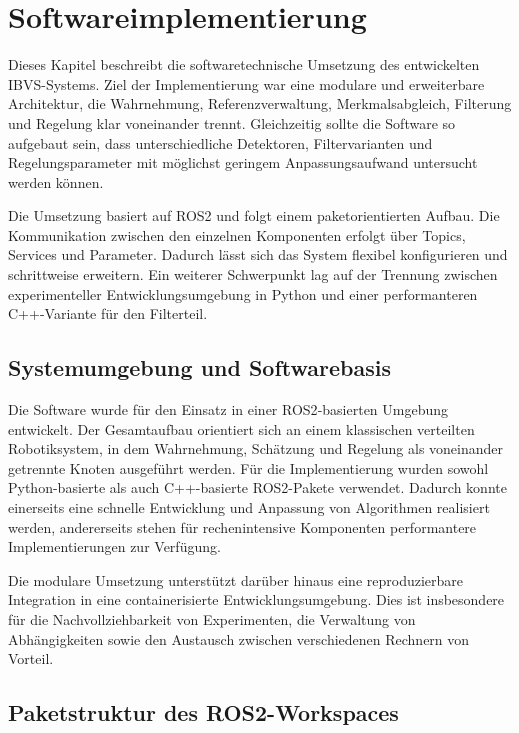\chapter{Softwareimplementierung}
\label{chap:softwareimplementierung}

Dieses Kapitel beschreibt die softwaretechnische Umsetzung des entwickelten \ac{IBVS}-Systems. Ziel der Implementierung war eine modulare und erweiterbare Architektur, die Wahrnehmung, Referenzverwaltung, Merkmalsabgleich, Filterung und Regelung klar voneinander trennt. Gleichzeitig sollte die Software so aufgebaut sein, dass unterschiedliche Detektoren, Filtervarianten und Regelungsparameter mit möglichst geringem Anpassungsaufwand untersucht werden können.

Die Umsetzung basiert auf \ac{ROS2} und folgt einem paketorientierten Aufbau. Die Kommunikation zwischen den einzelnen Komponenten erfolgt über Topics, Services und Parameter. Dadurch lässt sich das System flexibel konfigurieren und schrittweise erweitern. Ein weiterer Schwerpunkt lag auf der Trennung zwischen experimenteller Entwicklungsumgebung in Python und einer performanteren C++-Variante für den Filterteil.

\section{Systemumgebung und Softwarebasis}
\label{sec:systemumgebung_softwarebasis}

Die Software wurde für den Einsatz in einer \ac{ROS2}-basierten Umgebung entwickelt. Der Gesamtaufbau orientiert sich an einem klassischen verteilten Robotiksystem, in dem Wahrnehmung, Schätzung und Regelung als voneinander getrennte Knoten ausgeführt werden. Für die Implementierung wurden sowohl Python-basierte als auch C++-basierte \ac{ROS2}-Pakete verwendet. Dadurch konnte einerseits eine schnelle Entwicklung und Anpassung von Algorithmen realisiert werden, andererseits stehen für rechenintensive Komponenten performantere Implementierungen zur Verfügung.

Die modulare Umsetzung unterstützt darüber hinaus eine reproduzierbare Integration in eine containerisierte Entwicklungsumgebung. Dies ist insbesondere für die Nachvollziehbarkeit von Experimenten, die Verwaltung von Abhängigkeiten sowie den Austausch zwischen verschiedenen Rechnern von Vorteil.

\section{Paketstruktur des ROS2-Workspaces}
\label{sec:paketstruktur_ros2_workspace}

